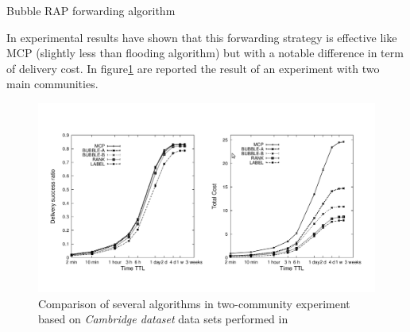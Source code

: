\begin{algorithm}
\caption{Bubble RAP forwarding algorithm}
\label{r_bubble_alg}
\begin{algorithmic}
 		\ENDIF 
 \ELSE
 		\ENDIF 
 \ENDIF
 \ENDFOR
\end{algorithmic}
\end{algorithm}

In \cite[6.1,6.2]{bubble} experimental results have shown that this forwarding strategy is effective like MCP (slightly less than flooding algorithm) but with a notable difference in term of delivery cost. In figure\ref{fig:bubblerap-performance} are reported the result of an experiment with two main communities.

\begin{figure}[h!]
	\begin{center}
    \includegraphics[scale=0.35]{img/bubblerap-performance.png}
    \caption{Comparison of several algorithms in two-community experiment based on \emph{Cambridge dataset} data sets performed in\cite[Figure 14 on SOCIALNETS Deliverable D2.3]{bubble}}
    \label{fig:bubblerap-performance}    
    \end{center}
\end{figure}
